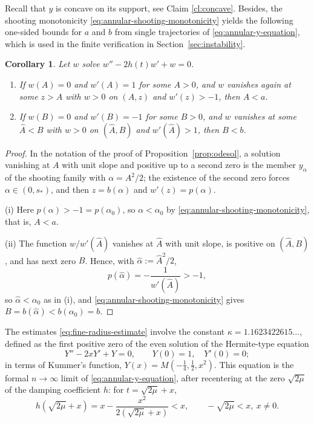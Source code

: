 \documentclass[11pt]{article}
\numberwithin{equation}{section}
\newtheorem{cor}[theorem]{Corollary}
\theoremstyle{definition}
\begin{document}
Recall that $y$ is concave on its support, see Claim \ref{cl:concave}. Besides, the shooting monotonicity \eqref{eq:annular-shooting-monotonicity} yields the following one-sided bounds for $a$ and $b$ from single trajectories of \eqref{eq:annular-y-equation}, which is used in the finite verification in Section~\ref{sec:instability}.

\begin{cor}\label{cor:shooting-bracket}
Let $w$ solve $w''-2h(t)w'+w=0$.
\begin{enumerate}[label=\textup{(\roman*)}]
\item If $w(A)=0$ and $w'(A)=1$ for some $A>0$, and $w$ vanishes again at some $z>A$ with $w>0$ on $(A,z)$ and $w'(z)>-1$, then $A<a$.
\item If $w(B)=0$ and $w'(B)=-1$ for some $B>0$, and $w$ vanishes at some $\hat A<B$ with $w>0$ on $(\hat A,B)$ and $w'(\hat A)>1$, then $B<b$.
\end{enumerate}
\end{cor}

\begin{proof}
In the notation of the proof of Proposition~\ref{prop:odesol}, a solution vanishing at $A$ with unit slope and positive up to a second zero is the member $y_\alpha$ of the shooting family with $\alpha=A^2/2$; the existence of the second zero forces $\alpha\in(0,s_*)$, and then $z=b(\alpha)$ and $w'(z)=p(\alpha)$.

(i) Here $p(\alpha)>-1=p(\alpha_0)$, so $\alpha<\alpha_0$ by \eqref{eq:annular-shooting-monotonicity}, that is, $A<a$.

(ii) The function $w/w'(\hat A)$ vanishes at $\hat A$ with unit slope, is positive on $(\hat A,B)$, and has next zero $B$. Hence, with $\hat\alpha:=\hat A^2/2$,
\[
    p(\hat\alpha)=-\frac1{w'(\hat A)}>-1,
\]
so $\hat\alpha<\alpha_0$ as in (i), and \eqref{eq:annular-shooting-monotonicity} gives $B=b(\hat\alpha)<b(\alpha_0)=b$.
\end{proof}


The estimates \eqref{eq:fine-radius-estimate} involve the constant $\kappa=1.1623422615\ldots$, defined as the first positive zero of the even solution of the Hermite-type equation
\begin{equation}\label{eq:hermite-kappa}
    Y''-2xY'+Y=0,
    \qquad
    Y(0)=1,\quad Y'(0)=0;\tag{H}
\end{equation}
in terms of Kummer's function, $Y(x)=M\!\left(-\tfrac14,\tfrac12,x^2\right)$.
This equation is the formal $n\to\infty$ limit of \eqref{eq:annular-y-equation}, after recentering at the zero $\sqrt{2\mu}$ of the damping coefficient $h$: for $t=\sqrt{2\mu}+x$,
\begin{equation}\label{eq:drift-comparison}
    h(\sqrt{2\mu}+x)
    =
    x-\frac{x^2}{2(\sqrt{2\mu}+x)}
    <x,
    \qquad
    -\sqrt{2\mu}<x,\ x\neq0.
\end{equation}
\end{document}
